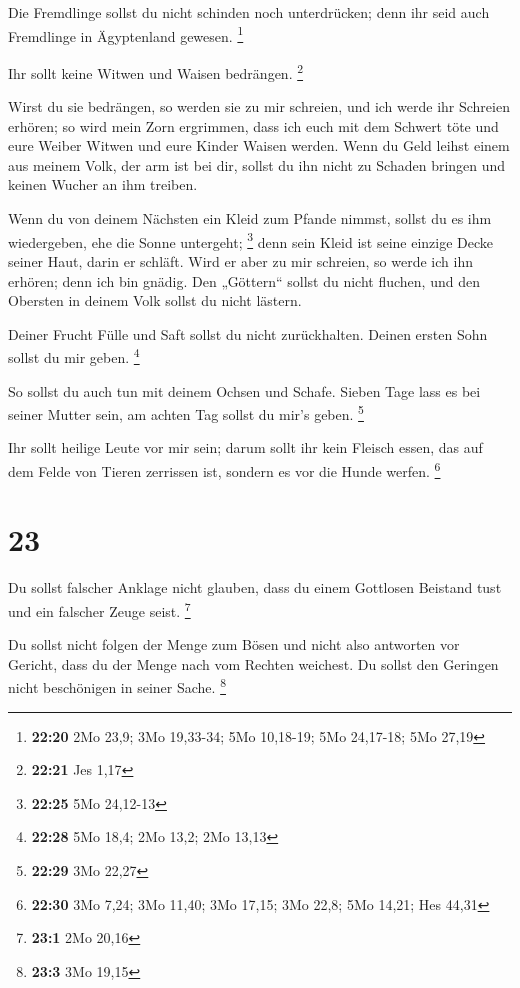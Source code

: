  Die Fremdlinge sollst du nicht schinden noch unterdrücken;
denn ihr seid auch Fremdlinge in Ägyptenland gewesen. \footnote{\textbf{22:20}
  2Mo 23,9; 3Mo 19,33-34; 5Mo 10,18-19; 5Mo 24,17-18; 5Mo 27,19}

 Ihr sollt keine Witwen und Waisen bedrängen. \footnote{\textbf{22:21}
  Jes 1,17}

 Wirst du sie bedrängen, so werden sie zu mir schreien, und
ich werde ihr Schreien erhören;  so wird mein Zorn
ergrimmen, dass ich euch mit dem Schwert töte und eure Weiber Witwen und
eure Kinder Waisen werden.  Wenn du Geld leihst einem aus
meinem Volk, der arm ist bei dir, sollst du ihn nicht zu Schaden bringen
und keinen Wucher an ihm treiben.

 Wenn du von deinem Nächsten ein Kleid zum Pfande nimmst,
sollst du es ihm wiedergeben, ehe die Sonne untergeht; \footnote{\textbf{22:25}
  5Mo 24,12-13}  denn sein Kleid ist seine einzige Decke
seiner Haut, darin er schläft. Wird er aber zu mir schreien, so werde
ich ihn erhören; denn ich bin gnädig.  Den „Göttern``
sollst du nicht fluchen, und den Obersten in deinem Volk sollst du nicht
lästern.

 Deiner Frucht Fülle und Saft sollst du nicht zurückhalten.
Deinen ersten Sohn sollst du mir geben. \footnote{\textbf{22:28} 5Mo
  18,4; 2Mo 13,2; 2Mo 13,13}

 So sollst du auch tun mit deinem Ochsen und Schafe. Sieben
Tage lass es bei seiner Mutter sein, am achten Tag sollst du mir's
geben. \footnote{\textbf{22:29} 3Mo 22,27}

 Ihr sollt heilige Leute vor mir sein; darum sollt ihr kein
Fleisch essen, das auf dem Felde von Tieren zerrissen ist, sondern es
vor die Hunde werfen. \footnote{\textbf{22:30} 3Mo 7,24; 3Mo 11,40; 3Mo
  17,15; 3Mo 22,8; 5Mo 14,21; Hes 44,31}

\hypertarget{section-4}{%
\section{23}\label{section-4}}

 Du sollst falscher Anklage nicht glauben, dass du einem
Gottlosen Beistand tust und ein falscher Zeuge seist. \footnote{\textbf{23:1}
  2Mo 20,16}

 Du sollst nicht folgen der Menge zum Bösen und nicht also
antworten vor Gericht, dass du der Menge nach vom Rechten weichest.
 Du sollst den Geringen nicht beschönigen in seiner Sache.
\footnote{\textbf{23:3} 3Mo 19,15}


